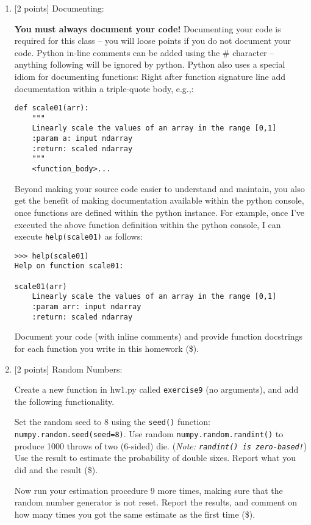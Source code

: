 \documentclass[10pt]{article}
\begin{document}
\begin{enumerate}
\item \label{prob:8} [2 points]
Documenting:

{\bf You must always document your code!}  Documenting your code is {\color{red} required} for this class -- you will loose points if you do not document your code.  Python in-line comments can be added using the \# character -- anything following will be ignored by python.  Python also uses a special idiom for documenting functions: Right after function signature line add documentation within a triple-quote body, e.g.,:
\begin{verbatim}
def scale01(arr):
    """
    Linearly scale the values of an array in the range [0,1]
    :param a: input ndarray
    :return: scaled ndarray
    """
    <function_body>...
\end{verbatim}
Beyond making your source code easier to understand and maintain, you also get the benefit of making documentation available within the python console, once functions are defined within the python instance.  For example, once I've executed the above function definition within the python console, I can execute {\tt help(scale01)} as follows:
\begin{verbatim}
>>> help(scale01)
Help on function scale01:

scale01(arr)
    Linearly scale the values of an array in the range [0,1]
    :param arr: input ndarray
    :return: scaled ndarray
\end{verbatim}

Document your code (with inline comments) and provide function docstrings for each function you write in this homework (\$).



\item \label{prob:9} [2 points]
Random Numbers:

Create a new function in hw1.py called {\tt exercise9} (no arguments), and add the following functionality.

Set the random seed to 8 using the {\tt seed()} function: {\tt numpy.random.seed(seed=8)}.  Use random {\tt numpy.random.randint()} to produce 1000 throws of two (6-sided) die.  ({\em Note: {\tt randint() is zero-based!}})  Use the result to estimate the probability of double sixes.  Report what you did and the result (\$).  

Now run your estimation procedure 9 more times, making sure that the random number generator is not reset.  Report the results, and comment on how many times you got the same estimate as the first time (\$).


\end{enumerate}
\end{document}
